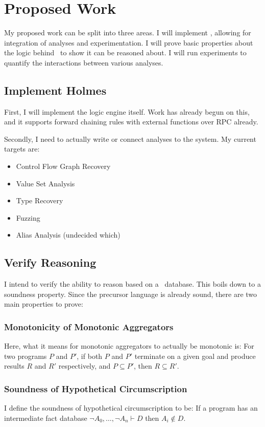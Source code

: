 \chapter{Proposed Work}
My proposed work can be split into three areas.
I will implement \sysname, allowing for integration of analyses and experimentation.
I will prove basic properties about the logic behind \sysname\ to show it can be reasoned about.
I will run experiments to quantify the interactions between various analyses.

\section{Implement Holmes}
First, I will implement the logic engine itself.
Work has already begun on this, and it supports forward chaining rules with external functions over RPC already.

Secondly, I need to actually write or connect analyses to the system.
My current targets are:
\begin{itemize}
        \item Control Flow Graph Recovery
        \item Value Set Analysis\cite{vsa}
        \item Type Recovery\cite{bitr}
        \item Fuzzing
        \item Alias Analysis (undecided which)
\end{itemize}

\section{Verify Reasoning}
I intend to verify the ability to reason based on a \sysname\ database.
This boils down to a soundness property.
Since the precursor language is already sound, there are two main properties to prove:
\subsection{Monotonicity of Monotonic Aggregators}
Here, what it means for monotonic aggregators to actually be monotonic is:
For two programs $P$ and $P'$, if both $P$ and $P'$ terminate on a given goal and produce results $R$ and $R'$ respectively, and $P \subseteq P'$, then $R \subseteq R'$.

\subsection{Soundness of Hypothetical Circumscription}
I define the soundness of hypothetical circumscription to be:
If a program has an intermediate fact database $\neg A_0,\ldots, \neg A_n \vdash D$ then $A_i \not \in D$. 


